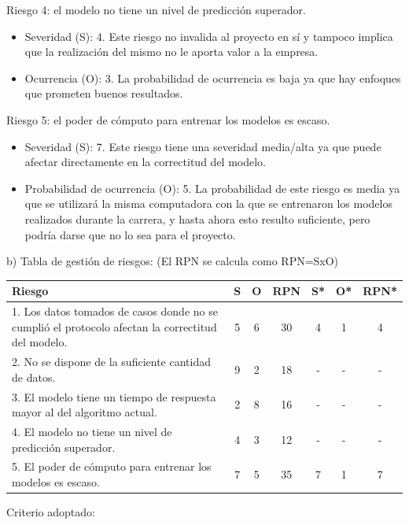 \documentclass[
11pt, %
]{charter}
\begin{document}
Riesgo 4: el modelo no tiene un nivel de predicción superador.
\begin{itemize}
	\item Severidad (S): 4.
	Este riesgo no invalida al proyecto en sí y tampoco implica que la realización del mismo no le aporta valor a la empresa.
	\item Ocurrencia (O): 3.
	La probabilidad de ocurrencia es baja ya que hay enfoques que prometen buenos resultados.
\end{itemize}

Riesgo 5: el poder de cómputo para entrenar los modelos es escaso.
\begin{itemize}
	\item Severidad (S): 7.
	Este riesgo tiene una severidad media/alta ya que puede afectar directamente en la correctitud del modelo.
	\item Probabilidad de ocurrencia (O): 5.
		La probabilidad de este riesgo es media ya que se utilizará la misma computadora con la que se entrenaron los modelos realizados durante la carrera, y hasta ahora esto resulto suficiente, pero podría darse que no lo sea para el proyecto.
\end{itemize}

b) Tabla de gestión de riesgos:      (El RPN se calcula como RPN=SxO)

\begin{table}[htpb]
\centering
\begin{tabularx}{\linewidth}{@{}|X|c|c|c|c|c|c|@{}}
\hline
\rowcolor[HTML]{C0C0C0} 
Riesgo & S & O & RPN & S* & O* & RPN* \\ \hline
1. Los datos tomados de casos donde no se cumplió el protocolo afectan la correctitud del modelo. & 5  & 6  &   30  &  4  &  1  &   4   \\ \hline
2. No se dispone de la suficiente cantidad de datos. & 9  & 2  &  18   &  -  &  -  &  -    \\ \hline
3. El modelo tiene un tiempo de respuesta mayor al del algoritmo actual.& 2  & 8  &  16   &  -  &  -  &  -    \\ \hline
4. El modelo no tiene un nivel de predicción superador.&  4 & 3  &  12   &  -  &  -  &  -    \\ \hline
5. El poder de cómputo para entrenar los modelos es escaso.  & 7  & 5  &  35   &  7  &  1  &   7   \\ \hline
\end{tabularx}%
\end{table}

Criterio adoptado: 
\end{document}
